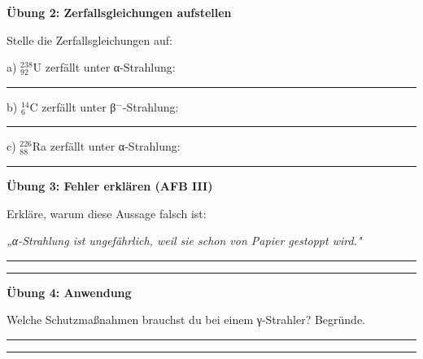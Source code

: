 \documentclass[10pt, a4paper]{article}
\newcommand{\fachfarbe}{physik}
\newcommand{\luecke}[1]{\rule{#1}{0.4pt}}
\newcommand{\abschnitt}[1]{%
    \vspace{8pt}\noindent\textbf{\textcolor{\fachfarbe}{#1}}\vspace{4pt}
}
\begin{document}
\begin{multicols}{2}
\abschnitt{Übung 2: Zerfallsgleichungen aufstellen}

Stelle die Zerfallsgleichungen auf:

\vspace{6pt}

a) $^{238}_{92}$U zerfällt unter α-Strahlung:

\vspace{4pt}
\luecke{6cm}

\vspace{6pt}

b) $^{14}_{6}$C zerfällt unter β$^-$-Strahlung:

\vspace{4pt}
\luecke{6cm}

\vspace{6pt}

c) $^{226}_{88}$Ra zerfällt unter α-Strahlung:

\vspace{4pt}
\luecke{6cm}

\vspace{8pt}


\abschnitt{Übung 3: Fehler erklären (AFB III)}

\begin{fehlerbox}
Erkläre, warum diese Aussage falsch ist:

\vspace{4pt}

\textit{„α-Strahlung ist ungefährlich, weil sie schon von Papier gestoppt wird."}

\vspace{4pt}
\luecke{5.8cm}

\vspace{4pt}
\luecke{5.8cm}
\end{fehlerbox}

\vspace{8pt}


\abschnitt{Übung 4: Anwendung}

Welche Schutzmaßnahmen brauchst du bei einem γ-Strahler? Begründe.

\vspace{4pt}
\luecke{5.8cm}

\vspace{4pt}
\luecke{5.8cm}

\end{multicols}
\end{document}
